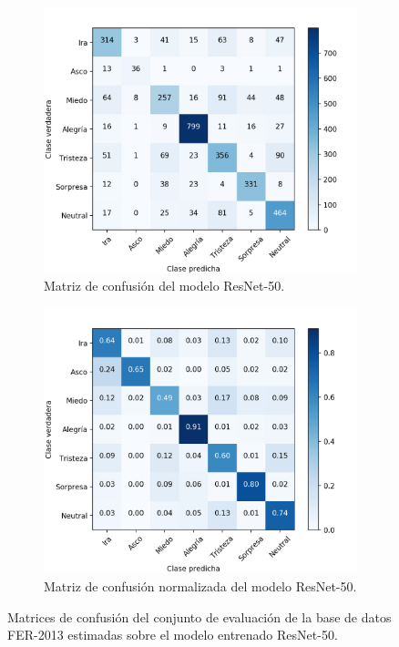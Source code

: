 \begin{figure}
    \centering
    \begin{subfigure}[t]{\textwidth}
      \centering
      \includegraphics[width=0.7\linewidth]{Images/ResNet-50_matrix.png}
      \caption{Matriz de confusión del modelo ResNet-50.}
      \label{fig:ResNet-50_matrix}
    \end{subfigure}
    
    \vspace{1cm}
    \begin{subfigure}[t]{\textwidth}
      \centering
      \includegraphics[width=0.7\linewidth]{Images/ResNet-50_matrix_norm.png}
      \caption{Matriz de confusión normalizada del modelo ResNet-50.}
      \label{fig:ResNet-50_matrix_norm}
    \end{subfigure}
    \caption{Matrices de confusión del conjunto de evaluación de la base de datos FER-2013 estimadas sobre el modelo entrenado ResNet-50.}
    \label{fig:ResNet-50_matrices}
\end{figure}


